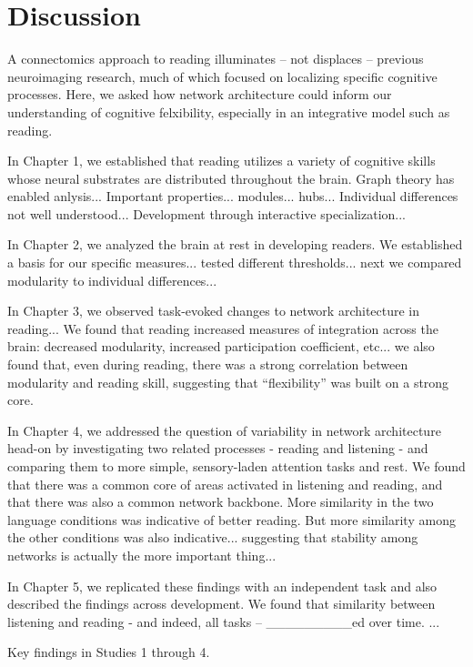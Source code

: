 \chapter{Discussion}

A connectomics approach to reading illuminates -- not displaces -- previous neuroimaging research, much of which focused on localizing specific cognitive processes. Here, we asked how network architecture could inform our understanding of cognitive felxibility, especially in an integrative model such as reading. 

In Chapter 1, we established that reading utilizes a variety of cognitive skills whose neural substrates are distributed throughout the brain. Graph theory has enabled anlysis...
Important properties... modules... hubs...
Individual differences not well understood...
Development through interactive specialization...

In Chapter 2, we analyzed the brain at rest in developing readers. We established a basis for our specific measures... tested different thresholds... next we compared modularity to individual differences...

In Chapter 3, we observed task-evoked changes to network architecture in reading... We found that reading increased measures of integration across the brain: decreased modularity, increased participation coefficient, etc... we also found that, even during reading, there was a strong correlation between modularity and reading skill, suggesting that ``flexibility'' was built on a strong core.

In Chapter 4, we addressed the question of variability in network architecture head-on by investigating two related processes - reading and listening - and comparing them to more simple, sensory-laden attention tasks and rest. We found that there was a common core of areas activated in listening and reading, and that there was also a common network backbone. More similarity in the two language conditions was indicative of better reading. But more similarity among the other conditions was also indicative... suggesting that stability among networks is actually the more important thing...

In Chapter 5, we replicated these findings with an independent task and also described the findings across development. We found that similarity between listening and reading - and indeed, all tasks -- _________ed over time. ...

\begin{table}[t]
	\renewcommand{\tabcolsep}{0.09cm}
	\centering
	
	\caption[Key findings.]{Key findings in Studies 1 through 4.}
	\label{table:ch6-key-findings}
\end{table}

